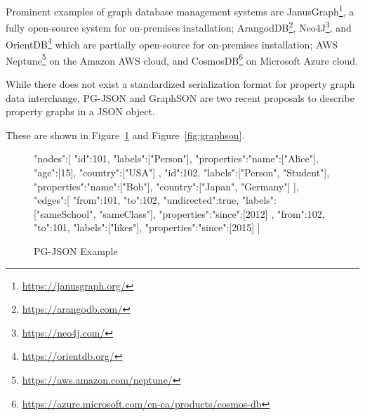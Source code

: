 Prominent examples of graph database management systems are JanusGraph\footnote{\url{https://janusgraph.org/}}, a fully open-source system for on-premises installation; ArangodDB\footnote{\url{https://arangodb.com/}}, Neo4J\footnote{\url{https://neo4j.com/}}, and OrientDB\footnote{\url{https://orientdb.org/}} which are partially open-source for on-premises installation; AWS Neptune\footnote{\url{https://aws.amazon.com/neptune/}} on the Amazon AWS cloud, and CosmosDB\footnote{\url{https://azure.microsoft.com/en-ca/products/cosmos-db}} on Microsoft Azure cloud. 

While there does not exist a standardized serialization format for property graph data interchange, PG-JSON and GraphSON are two recent proposals to describe property graphs in a JSON object. 
\begin{advanced}
These are shown in Figure~\ref{fig:pgjson} and Figure~\ref{fig:graphson}.

\begin{figure}[h]
\begin{jsoncode}
{
  "nodes":[
    {
     "id":101,
     "labels":["Person"],
     "properties":{"name":["Alice"], "age":[15], "country":["USA"]}
    },
    {
     "id":102,
     "labels":["Person", "Student"],
     "properties":{"name":["Bob"], "country":["Japan", "Germany"]}
    }
  ],
  "edges":[
    {
     "from":101,
     "to":102,
     "undirected":true,
     "labels":["sameSchool", "sameClass"],
     "properties":{"since":[2012]}
    },
    {
     "from":102,
     "to":101,
     "labels":["likes"],
     "properties":{"since":[2015]}
    }
  ]
}
\end{jsoncode}

\caption{PG-JSON Example}
\label{fig:pgjson}

\end{figure}


\end{advanced}
